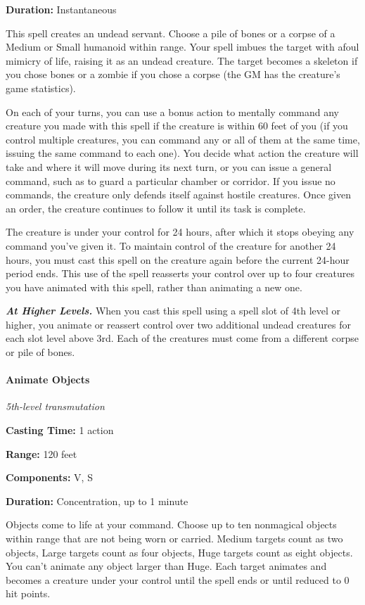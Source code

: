 \documentclass[
]{article}
\begin{document}
\textbf{Duration:} Instantaneous

This spell creates an undead servant. Choose a pile of bones or a corpse
of a Medium or Small humanoid within range. Your spell imbues the target
with afoul mimicry of life, raising it as an undead creature. The target
becomes a skeleton if you chose bones or a zombie if you chose a corpse
(the GM has the creature's game statistics).

On each of your turns, you can use a bonus action to mentally command
any creature you made with this spell if the creature is within 60 feet
of you (if you control multiple creatures, you can command any or all of
them at the same time, issuing the same command to each one). You decide
what action the creature will take and where it will move during its
next turn, or you can issue a general command, such as to guard a
particular chamber or corridor. If you issue no commands, the creature
only defends itself against hostile creatures. Once given an order, the
creature continues to follow it until its task is complete.

The creature is under your control for 24 hours, after which it stops
obeying any command you've given it. To maintain control of the creature
for another 24 hours, you must cast this spell on the creature again
before the current 24-hour period ends. This use of the spell reasserts
your control over up to four creatures you have animated with this
spell, rather than animating a new one.

\emph{\textbf{At Higher Levels.}} When you cast this spell using a spell
slot of 4th level or higher, you animate or reassert control over two
additional undead creatures for each slot level above 3rd. Each of the
creatures must come from a different corpse or pile of bones.

\hypertarget{animate-objects}{%
\paragraph{Animate Objects}\label{animate-objects}}

\emph{5th-level transmutation}

\textbf{Casting Time:} 1 action

\textbf{Range:} 120 feet

\textbf{Components:} V, S

\textbf{Duration:} Concentration, up to 1 minute

Objects come to life at your command. Choose up to ten nonmagical
objects within range that are not being worn or carried. Medium targets
count as two objects, Large targets count as four objects, Huge targets
count as eight objects. You can't animate any object larger than Huge.
Each target animates and becomes a creature under your control until the
spell ends or until reduced to 0 hit points.
\end{document}
